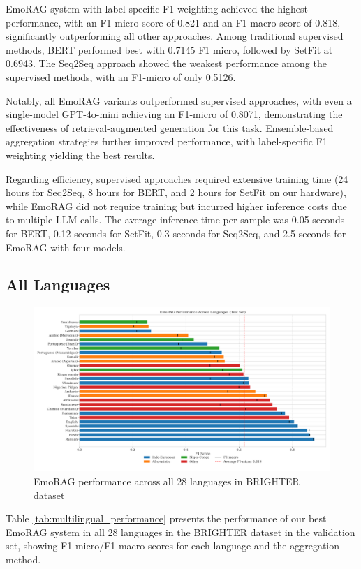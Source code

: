 \documentclass[a4paper,12pt]{extarticle}
\begin{document}
EmoRAG system with label-specific F1 weighting achieved the highest performance, with an F1 micro score of 0.821 and an F1 macro score of 0.818, significantly outperforming all other approaches. Among traditional supervised methods, BERT performed best with 0.7145 F1 micro, followed by SetFit at 0.6943. The Seq2Seq approach showed the weakest performance among the supervised methods, with an F1-micro of only 0.5126.

Notably, all EmoRAG variants outperformed supervised approaches, with even a single-model GPT-4o-mini achieving an F1-micro of 0.8071, demonstrating the effectiveness of retrieval-augmented generation for this task. Ensemble-based aggregation strategies further improved performance, with label-specific F1 weighting yielding the best results.

Regarding efficiency, supervised approaches required extensive training time (24 hours for Seq2Seq, 8 hours for BERT, and 2 hours for SetFit on our hardware), while EmoRAG did not require training but incurred higher inference costs due to multiple LLM calls. The average inference time per sample was 0.05 seconds for BERT, 0.12 seconds for SetFit, 0.3 seconds for Seq2Seq, and 2.5 seconds for EmoRAG with four models.

\subsection{All Languages}

\begin{figure}[h]
    \centering
    \includegraphics[width=1\textwidth]{emorag_by_language.png}
    \caption{EmoRAG performance across all 28 languages in BRIGHTER dataset}
    \label{fig:emorag_by_language}
\end{figure}


Table \ref{tab:multilingual_performance} presents the performance of our best EmoRAG system in all 28 languages in the BRIGHTER dataset in the validation set, showing F1-micro/F1-macro scores for each language and the aggregation method.
\end{document}
